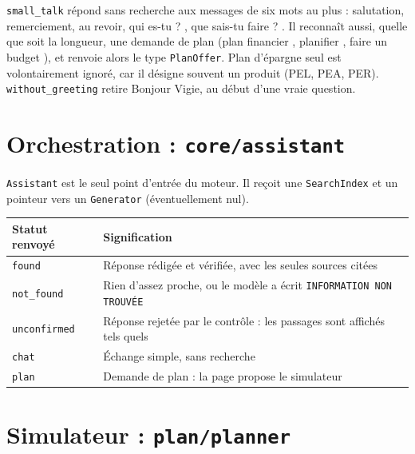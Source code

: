 \documentclass[11pt,a4paper]{article}
\begin{document}
{{\texttt{small\_talk} répond sans recherche aux messages de six mots au plus : salutation, remerciement, au revoir, \og qui es-tu ? \fg, \og que sais-tu faire ? \fg. Il reconnaît aussi, quelle que soit la longueur, une demande de plan (\og plan financier \fg, \og planifier \fg, \og faire un budget \fg), et renvoie alors le type \texttt{PlanOffer}. \og Plan d'épargne \fg{} seul est volontairement ignoré, car il désigne souvent un produit (PEL, PEA, PER). \texttt{without\_greeting} retire \og Bonjour Vigie, \fg{} au début d'une vraie question.

\section{Orchestration : \texttt{core/assistant}}

\texttt{Assistant} est le seul point d'entrée du moteur. Il reçoit une \texttt{SearchIndex} et un pointeur vers un \texttt{Generator} (éventuellement nul).



\begin{center}
\small
\begin{tabularx}{\linewidth}{@{}l X@{}}
\toprule
Statut renvoyé & Signification \\
\midrule
\texttt{found} & Réponse rédigée et vérifiée, avec les seules sources citées \\
\texttt{not\_found} & Rien d'assez proche, ou le modèle a écrit \texttt{INFORMATION NON TROUVÉE} \\
\texttt{unconfirmed} & Réponse rejetée par le contrôle : les passages sont affichés tels quels \\
\texttt{chat} & Échange simple, sans recherche \\
\texttt{plan} & Demande de plan : la page propose le simulateur \\
\bottomrule
\end{tabularx}
\end{center}

\section{Simulateur : \texttt{plan/planner}}

}}
\end{document}
